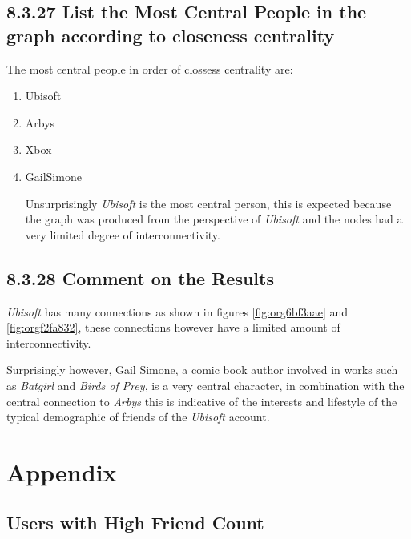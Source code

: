 \documentclass[11pt]{article}
\begin{document}
\subsection{8.3.27 List the Most Central People in the graph according to closeness centrality}
\label{sec:org598c1d2}
The most central people in order of clossess centrality are:

\begin{enumerate}
\item Ubisoft
\item Arbys
\item Xbox
\item GailSimone

Unsurprisingly \emph{Ubisoft} is the most central person, this is expected because the graph was produced from the perspective of \emph{Ubisoft} and the nodes had a very limited degree of interconnectivity.
\end{enumerate}


\subsection{8.3.28 Comment on the Results}
\label{sec:org28f5d90}
\emph{Ubisoft} has many connections as shown in figures \ref{fig:org6bf3aae} and \ref{fig:orgf2fa832}, these connections however have a limited amount of interconnectivity.

Surprisingly however, Gail Simone, a comic book author involved in works such as \emph{Batgirl} and \emph{Birds of Prey}, is a very central character, in combination with the central connection to \emph{Arbys} this is indicative of the interests and lifestyle of the typical demographic of friends of the \emph{Ubisoft} account.
\section{Appendix}
\label{sec:org2badfc4}
\subsection{Users with High Friend Count}
\label{sec:org857d803}
\end{document}
